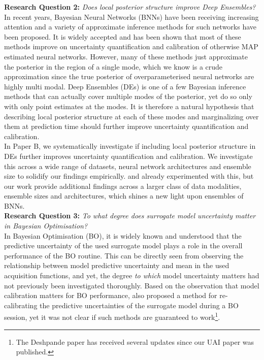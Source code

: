  \noindent \textbf{Research Question 2:} \textit{Does local posterior structure improve Deep Ensembles?}\\

\noindent In recent years, Bayesian Neural Networks (BNNs) have been receiving increasing attention and a variety of approximate inference methods for such networks have been proposed. It is widely accepted and has been shown that most of these methods improve on uncertainty quantification and calibration of otherwise MAP estimated neural networks. However, many of these methods just approximate the posterior in the region of a single mode, which we know is a crude approximation since the true posterior of overparameterised neural networks are highly multi modal. Deep Ensembles (DEs) is one of a few Bayesian inference methods that can actually cover multiple modes of the posterior, yet do so only with only point estimates at the modes. It is therefore a natural hypothesis that describing local posterior structure at each of these modes and marginalizing over them at prediction time should further improve uncertainty quantification and calibration.\\

\noindent In Paper B, we systematically investigate if including local posterior structure in DEs further improves uncertainty quantification and calibration. We investigate this across a wide range of datasets, neural network architectures and ensemble size to solidify our findings empirically. \cite{2021_MOLA} and \cite{2020_MultiSWAG} already experimented with this, but our work provide additional findings across a larger class of data modalities, ensemble sizes and architectures, which shines a new light upon ensembles of BNNs.\\

\noindent \textbf{Research Question 3:} \textit{To what degree does surrogate model uncertainty matter in Bayesian Optimisation?}\\

\noindent In Bayesian Optimisation (BO), it is widely known and understood that the predictive uncertainty of the used surrogate model plays a role in the overall performance of the BO routine. This can be directly seen from observing the relationship between model predictive uncertainty and mean in the used acquisition functions, and yet, the degree \textit{to which} model uncertainty matters had not previously been investigated thoroughly. Based on the observation that model calibration matters for BO performance, \cite{recalibration_BO} also proposed a method for re-calibrating the predictive uncertainties of the surrogate model during a BO session, yet it was not clear if such methods are guaranteed to work\footnote{The Deshpande paper has received several updates since our UAI paper was published.}. \\

